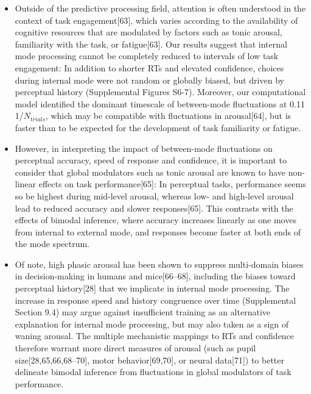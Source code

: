 \documentclass[
]{article}
\begin{document}
\begin{itemize}
\item
  Outside of the predictive processing field, attention is often
  understood in the context of task engagement{[}63{]}, which varies
  according to the availability of cognitive resources that are
  modulated by factors such as tonic arousal, familiarity with the task,
  or fatigue{[}63{]}. Our results suggest that internal mode processing
  cannot be completely reduced to intervals of low task engagement: In
  addition to shorter RTs and elevated confidence, choices during
  internal mode were not random or globally biased, but driven by
  perceptual history (Supplemental Figures S6-7). Moreover, our
  computational model identified the dominant timescale of between-mode
  fluctuations at 0.11 1/\(N_{trials}\), which may be compatible with
  fluctuations in arousal{[}64{]}, but is faster than to be expected for
  the development of task familiarity or fatigue.
\item
  However, in interpreting the impact of between-mode fluctuations on
  perceptual accuracy, speed of response and confidence, it is important
  to consider that global modulators such as tonic arousal are known to
  have non-linear effects on task performance{[}65{]}: In perceptual
  tasks, performance seems so be highest during mid-level arousal,
  whereas low- and high-level arousal lead to reduced accuracy and
  slower responses{[}65{]}. This contrasts with the effects of bimodal
  inference, where accuracy increases linearly as one moves from
  internal to external mode, and responses become faster at both ends of
  the mode spectrum.
\item
  Of note, high phasic arousal has been shown to suppress multi-domain
  biases in decision-making in humans and mice{[}66--68{]}, including
  the biases toward perceptual history{[}28{]} that we implicate in
  internal mode processing. The increase in response speed and history
  congruence over time (Supplemental Section 9.4) may argue against
  insufficient training as an alternative explanation for internal mode
  processing, but may also taken as a sign of waning arousal. The
  multiple mechanistic mappings to RTs and confidence therefore warrant
  more direct measures of arousal (such as pupil
  size{[}28,65,66,68--70{]}, motor behavior{[}69,70{]}, or neural
  data{[}71{]}) to better delineate bimodal inference from fluctuations
  in global modulators of task performance.
\end{itemize}
\end{document}
